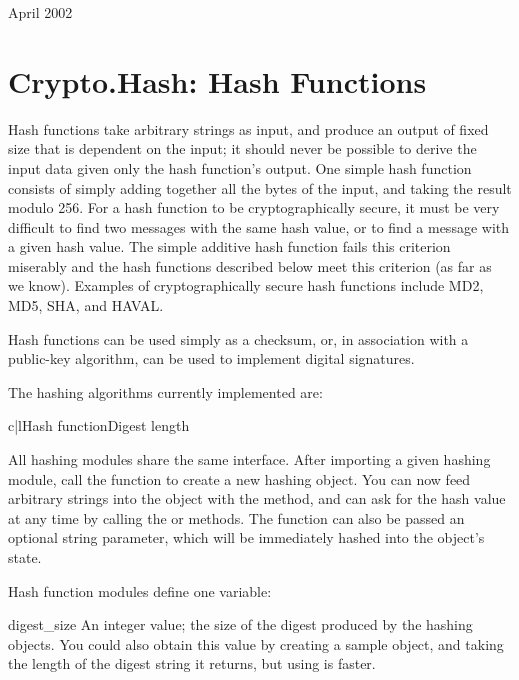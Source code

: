 \documentclass{howto}
\begin{document}
April 2002

\section{Crypto.Hash: Hash Functions}

Hash functions take arbitrary strings as input, and produce an output
of fixed size that is dependent on the input; it should never be
possible to derive the input data given only the hash function's
output.  One simple hash function consists of simply adding together
all the bytes of the input, and taking the result modulo 256.  For a
hash function to be cryptographically secure, it must be very
difficult to find two messages with the same hash value, or to find a
message with a given hash value.  The simple additive hash function
fails this criterion miserably and the hash functions described below
meet this criterion (as far as we know).  Examples of
cryptographically secure hash functions include MD2, MD5, SHA, and
HAVAL.

Hash functions can be used simply as a checksum, or, in association with a
public-key algorithm, can be used to implement digital signatures.
 
The hashing algorithms currently implemented are:

\begin{tableii}{c|l}{}{Hash function}{Digest length}
\end{tableii}

All hashing modules share the same interface.  After importing a given
hashing module, call the  function to create a new
hashing object. You can now feed arbitrary strings into the object
with the  method, and can ask for the hash value at
any time by calling the  or 
methods.  The  function can also be passed an optional
string parameter, which will be immediately hashed into the object's
state.

Hash function modules define one variable:

\begin{datadesc}{digest_size}
An integer value; the size of the digest
produced by the hashing objects.  You could also obtain this value by
creating a sample object, and taking the length of the digest string
it returns, but using  is faster.
\end{datadesc}
\end{document}
